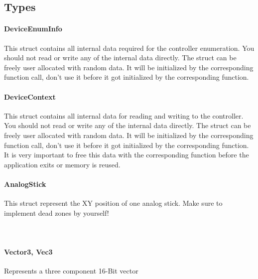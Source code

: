 \subsection{Types}
\paragraph{DeviceEnumInfo} This struct contains all internal data required for the controller enumeration. You should not read or write any of the internal data directly. The struct can be freely user allocated with random data. It will be initialized by the corresponding function call, don't use it before it got initialized by the corresponding function.

\paragraph{DeviceContext} This struct contains all internal data for reading and writing to the controller. You should not read or write any of the internal data directly. The struct can be freely user allocated with random data. It will be initialized by the corresponding function call, don't use it before it got initialized by the corresponding function. It is very important to free this data with the corresponding function before the application exits or memory is reused. 

\paragraph{AnalogStick} This struct represent the XY position of one analog stick. Make sure to implement dead zones by yourself! \\

 \\

 \\

\paragraph{Vector3, Vec3} Represents a three component 16-Bit vector \\

 \\

 \\

